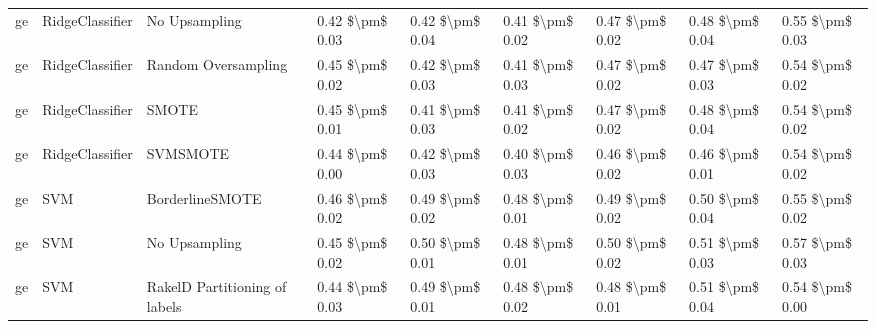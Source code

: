 \begin{tabular}{lllllllll}
      ge &                 RidgeClassifier &                 No Upsampling & 0.42 \$\textbackslash pm\$ 0.03 &           0.42 \$\textbackslash pm\$ 0.04 &       0.41 \$\textbackslash pm\$ 0.02 &        0.47 \$\textbackslash pm\$ 0.02 &                         0.48 \$\textbackslash pm\$ 0.04 &     0.55 \$\textbackslash pm\$ 0.03 \\
      ge &                 RidgeClassifier &           Random Oversampling & 0.45 \$\textbackslash pm\$ 0.02 &           0.42 \$\textbackslash pm\$ 0.03 &       0.41 \$\textbackslash pm\$ 0.03 &        0.47 \$\textbackslash pm\$ 0.02 &                         0.47 \$\textbackslash pm\$ 0.03 &     0.54 \$\textbackslash pm\$ 0.02 \\
      ge &                 RidgeClassifier &                         SMOTE & 0.45 \$\textbackslash pm\$ 0.01 &           0.41 \$\textbackslash pm\$ 0.03 &       0.41 \$\textbackslash pm\$ 0.02 &        0.47 \$\textbackslash pm\$ 0.02 &                         0.48 \$\textbackslash pm\$ 0.04 &     0.54 \$\textbackslash pm\$ 0.02 \\
      ge &                 RidgeClassifier &                      SVMSMOTE & 0.44 \$\textbackslash pm\$ 0.00 &           0.42 \$\textbackslash pm\$ 0.03 &       0.40 \$\textbackslash pm\$ 0.03 &        0.46 \$\textbackslash pm\$ 0.02 &                         0.46 \$\textbackslash pm\$ 0.01 &     0.54 \$\textbackslash pm\$ 0.02 \\
      ge &                             SVM &               BorderlineSMOTE & 0.46 \$\textbackslash pm\$ 0.02 &           0.49 \$\textbackslash pm\$ 0.02 &       0.48 \$\textbackslash pm\$ 0.01 &        0.49 \$\textbackslash pm\$ 0.02 &                         0.50 \$\textbackslash pm\$ 0.04 &     0.55 \$\textbackslash pm\$ 0.02 \\
      ge &                             SVM &                 No Upsampling & 0.45 \$\textbackslash pm\$ 0.02 &           0.50 \$\textbackslash pm\$ 0.01 &       0.48 \$\textbackslash pm\$ 0.01 &        0.50 \$\textbackslash pm\$ 0.02 &                         0.51 \$\textbackslash pm\$ 0.03 &     0.57 \$\textbackslash pm\$ 0.03 \\
      ge &                             SVM & RakelD Partitioning of labels & 0.44 \$\textbackslash pm\$ 0.03 &           0.49 \$\textbackslash pm\$ 0.01 &       0.48 \$\textbackslash pm\$ 0.02 &        0.48 \$\textbackslash pm\$ 0.01 &                         0.51 \$\textbackslash pm\$ 0.04 &     0.54 \$\textbackslash pm\$ 0.00 \\

\end{tabular}
